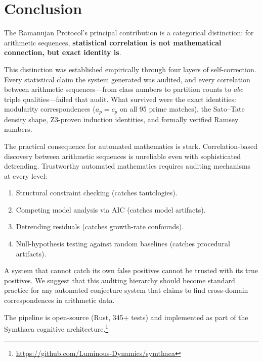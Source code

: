\documentclass[11pt,a4paper]{article}
\begin{document}
\section{Conclusion}
\label{sec:conclusion}

The Ramanujan Protocol's principal contribution is a categorical
distinction: for arithmetic sequences, \textbf{statistical correlation
is not mathematical connection, but exact identity is}.

This distinction was established empirically through four layers of
self-correction. Every statistical claim the system generated was
audited, and every correlation between arithmetic sequences---from
class numbers to partition counts to $abc$ triple qualities---failed
that audit. What survived were the exact identities: modularity
correspondences ($a_p = c_p$ on all 95 prime matches), the Sato--Tate
density shape, Z3-proven induction identities, and formally verified
Ramsey numbers.

The practical consequence for automated mathematics is stark.
Correlation-based discovery between arithmetic sequences is unreliable
even with sophisticated detrending. Trustworthy automated mathematics
requires auditing mechanisms at every level:
\begin{enumerate}
  \item Structural constraint checking (catches tautologies).
  \item Competing model analysis via AIC (catches model artifacts).
  \item Detrending residuals (catches growth-rate confounds).
  \item Null-hypothesis testing against random baselines (catches
    procedural artifacts).
\end{enumerate}

A system that cannot catch its own false positives cannot be trusted
with its true positives. We suggest that this auditing hierarchy should
become standard practice for any automated conjecture system that
claims to find cross-domain correspondences in arithmetic data.

The pipeline is open-source (Rust, 345+ tests) and implemented as part
of the Symthaea cognitive architecture.\footnote{%
  \url{https://github.com/Luminous-Dynamics/symthaea}}




\end{document}

